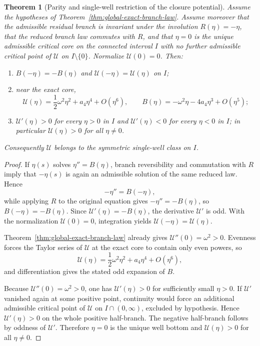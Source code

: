 \documentclass[12pt,a4paper]{article}
\newtheorem{theorem}{Theorem}[section]
\begin{document}
\begin{theorem}[Parity and single-well restriction of the closure potential]
\label{thm:appendix-single-well-341}
Assume the hypotheses of Theorem~\ref{thm:global-exact-branch-law}. Assume moreover that the admissible residual branch is invariant under the involution $R(\eta)=-\eta$, that the reduced branch law commutes with $R$, and that $\eta=0$ is the unique admissible critical core on the connected interval $I$ with no further admissible critical point of $\mathcal U$ on $I\setminus\{0\}$. Normalize $\mathcal U(0)=0$. Then:
\begin{enumerate}[label=(\roman*)]
 \item $B(-\eta)=-B(\eta)$ and $\mathcal U(-\eta)=\mathcal U(\eta)$ on $I$;
 \item near the exact core,
 \[
 \mathcal U(\eta)=\frac12\omega^2\eta^2+a_4\eta^4+O(\eta^6),
 \qquad
 B(\eta)=-\omega^2\eta-4a_4\eta^3+O(\eta^5);
 \]
 \item $\mathcal U'(\eta)>0$ for every $\eta>0$ in $I$ and $\mathcal U'(\eta)<0$ for every $\eta<0$ in $I$; in particular $\mathcal U(\eta)>0$ for all $\eta\neq0$.
\end{enumerate}
Consequently $\mathcal U$ belongs to the symmetric single-well class on $I$.
\end{theorem}

\begin{proof}
If $\eta(s)$ solves $\eta''=B(\eta)$, branch reversibility and commutation with $R$ imply that $-\eta(s)$ is again an admissible solution of the same reduced law. Hence
\[
 -\eta'' = B(-\eta),
\]
while applying $R$ to the original equation gives $-\eta''=-B(\eta)$, so $B(-\eta)=-B(\eta)$. Since $\mathcal U'(\eta)=-B(\eta)$, the derivative $\mathcal U'$ is odd. With the normalization $\mathcal U(0)=0$, integration yields $\mathcal U(-\eta)=\mathcal U(\eta)$.

Theorem~\ref{thm:global-exact-branch-law} already gives $\mathcal U''(0)=\omega^2>0$. Evenness forces the Taylor series of $\mathcal U$ at the exact core to contain only even powers, so
\[
 \mathcal U(\eta)=\frac12\omega^2\eta^2+a_4\eta^4+O(\eta^6),
\]
and differentiation gives the stated odd expansion of $B$.

Because $\mathcal U''(0)=\omega^2>0$, one has $\mathcal U'(\eta)>0$ for sufficiently small $\eta>0$. If $\mathcal U'$ vanished again at some positive point, continuity would force an additional admissible critical point of $\mathcal U$ on $I\cap(0,\infty)$, excluded by hypothesis. Hence $\mathcal U'(\eta)>0$ on the whole positive half-branch. The negative half-branch follows by oddness of $\mathcal U'$. Therefore $\eta=0$ is the unique well bottom and $\mathcal U(\eta)>0$ for all $\eta\neq0$.
\end{proof}
\end{document}
